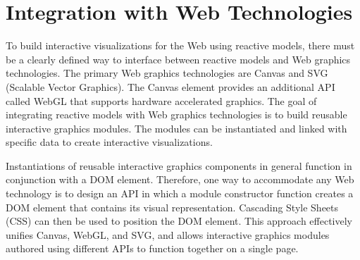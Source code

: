 \section{Integration with Web Technologies}
To build interactive visualizations for the Web using reactive models, there must be a clearly defined way to interface between reactive models and Web graphics technologies. The primary Web graphics technologies are Canvas and SVG (Scalable Vector Graphics). The Canvas element provides an additional API called WebGL that supports hardware accelerated graphics. The goal of integrating reactive models with Web graphics technologies is to build reusable interactive graphics modules. The modules can be instantiated and linked with specific data to create interactive visualizations.

Instantiations of reusable interactive graphics components in general function in conjunction with a DOM element. Therefore, one way to accommodate any Web technology is to design an API in which a module constructor function creates a DOM element that contains its visual representation. Cascading Style Sheets (CSS) can then be used to position the DOM element. This approach effectively unifies Canvas, WebGL, and SVG, and allows interactive graphics modules authored using different APIs to function together on a single page.

